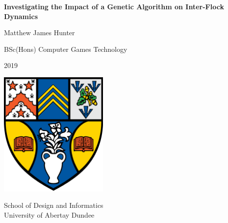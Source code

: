 \documentclass{article}
\begin{document}
\begin{titlepage}
	\begin{center}
       	 	\vspace*{1cm}

        		\Huge
        		\textbf{Investigating the Impact of a Genetic Algorithm on Inter-Flock Dynamics}
 
        		\vspace{1.5cm}
 
        		Matthew James Hunter
 
        		\vfill

        		BSc(Hons) Computer Games Technology

		2019
 
        		\vspace{0.8cm}
 
        		\includegraphics[width=0.4\textwidth]{../Images/Abertay_Coat_Of_Arms}
 
        		\Large
		School of Design and Informatics\\
		University of Abertay Dundee\\
    	\end{center}
\end{titlepage}

\newpage
{}
\doublespacing
	\tableofcontents
	\listoffigures
	\listoftables
\newpage


\singlespacing
\newpage
	
\newpage
{} 
	
\newpage
	
\newpage
	
\newpage
	
\newpage
	
\newpage
	
\newpage
	
\newpage

\newpage
	
	
\end{document}
